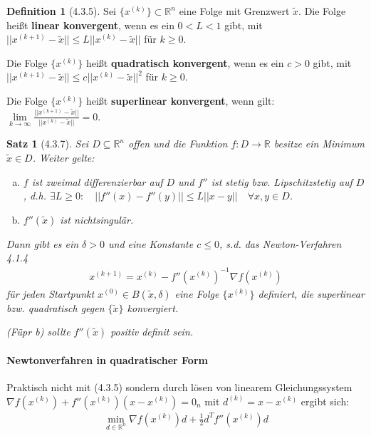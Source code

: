 \documentclass[ngerman,halfparskip]{scrartcl}
\newtheorem*{satz}{Satz}
\theoremstyle{definition}
\newtheorem*{defin}{Definition}
\def\R{\mathbb R}
\begin{document}
\begin{defin}[4.3.5]
Sei $\{x^{(k)}\}\subset\R^n$ eine Folge mit Grenzwert $\tilde x$. Die Folge heißt \textbf{linear konvergent}, wenn es ein $0<L<1$ gibt, mit $||x^{(k+1)}-\tilde x||\leq L||x^{(k)}-\tilde x||$ für $k\geq 0$. 

Die Folge $\{x^{(k)}\}$ heißt \textbf{quadratisch konvergent}, wenn es ein $c>0$ gibt, mit $||x^{(k+1)}-\tilde x||\leq c||x^{(k)}-\tilde x||^2$ für $k\geq 0$.

Die Folge $\{x^{(k)}\}$ heißt \textbf{superlinear konvergent}, wenn gilt:  $\lim\limits_{k\to \infty}\frac {||x^{(k+1)}-\tilde x||}{||x^{(k)}-\tilde x||}=0$.
\end{defin}

\begin{satz}[4.3.7]
Sei $D\subseteq \R^n$ offen und die Funktion $f:D\to\R$ besitze ein Minimum $\tilde x\in D$. Weiter gelte:
\begin{enumerate}[a)]
\item $f$ ist zweimal differenzierbar auf $D$ und $f''$ ist stetig bzw. Lipschitzstetig auf $D$, d.h. $\exists L\geq 0: \quad ||f''(x)-f''(y)||\leq L||x-y|| \quad \forall x,y\in D$.
\item $f''(\tilde x)$ ist nichtsingulär.
\end{enumerate}
Dann gibt es ein $\delta >0$ und eine Konstante $c\leq 0$, s.d. das Newton-Verfahren 4.1.4\begin{gather*}\tag{4.3.5}x^{(k+1)}=x^{(k)}-f''(x^{(k)})^{-1}\nabla f (x^{(k)})
\end{gather*} für jeden Startpunkt $x^{(0)}\in B(\tilde x,\delta)$ eine Folge $\{x^{(k)}\}$ definiert, die superlinear bzw. quadratisch gegen $\{\tilde x\}$ konvergiert.

(Füpr b) sollte $f''(\tilde x)$ positiv definit sein. 
\end{satz}

\paragraph{Newtonverfahren in quadratischer Form} Praktisch nicht mit (4.3.5) sondern durch lösen von linearem Gleichungssystem $\nabla f(x^{(k)})+f''(x^ {(k)})(x-x^{(k)})=0_n$ mit $d^{(k)}=x-x^{(k)}$ ergibt sich:
\begin{gather*}\tag{Q$_k$}
\min\limits_{d\in\R^n}\nabla f(x^{(k)})d+\frac 12 d^Tf''(x^{(k)})d
\end{gather*}
\end{document}
